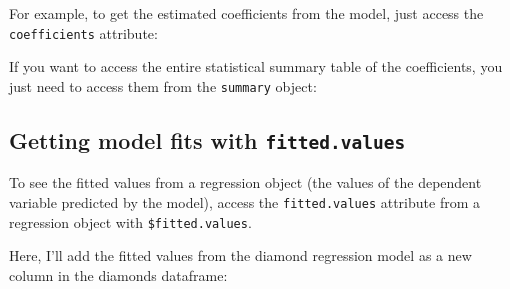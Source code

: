 \documentclass[]{book}
\newenvironment{Shaded}{\begin{snugshade}}{\end{snugshade}}
\newcommand{\KeywordTok}[1]{\textcolor[rgb]{0.13,0.29,0.53}{\textbf{#1}}}
\newcommand{\CommentTok}[1]{\textcolor[rgb]{0.56,0.35,0.01}{\textit{#1}}}
\newcommand{\OperatorTok}[1]{\textcolor[rgb]{0.81,0.36,0.00}{\textbf{#1}}}
\newcommand{\NormalTok}[1]{#1}
\theoremstyle{definition}
\theoremstyle{definition}
\theoremstyle{remark}
\begin{document}
For example, to get the estimated coefficients from the model, just
access the \texttt{coefficients} attribute:

\begin{Shaded}
\end{Shaded}

If you want to access the entire statistical summary table of the
coefficients, you just need to access them from the \texttt{summary}
object:

\begin{Shaded}
\end{Shaded}

\subsection{\texorpdfstring{Getting model fits with
\texttt{fitted.values}}{Getting model fits with fitted.values}}\label{getting-model-fits-with-fitted.values}

To see the fitted values from a regression object (the values of the
dependent variable predicted by the model), access the
\texttt{fitted.values} attribute from a regression object with
\texttt{\$fitted.values}.

Here, I'll add the fitted values from the diamond regression model as a
new column in the diamonds dataframe:
\end{document}
